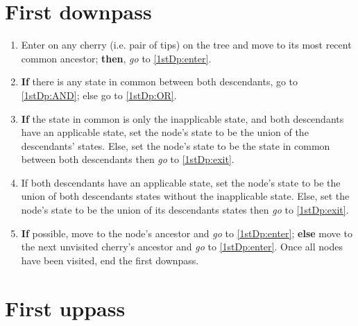 \documentclass[a4paper,12pt]{article}
\begin{document}

\section{First downpass} \label{1stDp}

\begin{enumerate}
    \item Enter on any cherry (i.e. pair of tips) on the tree and move to its most recent common ancestor; \textbf{then}, \textit{go} to \ref{1stDp:enter}.
    \item \label{1stDp:enter} \textbf{If} there is any state in common between both descendants, go to \ref{1stDp:AND}; else go to \ref{1stDp:OR}.
    \item \label{1stDp:AND} \textbf{If} the state in common is only the inapplicable state, and both descendants have an applicable state, set the node's state to be the union of the descendants' states. Else, set the node's state to be the state in common between both descendants then \textit{go} to \ref{1stDp:exit}.
    \item \label{1stDp:OR}  If both descendants have an applicable state, set the node's state to be the union of both descendants states without the inapplicable state. Else, set the node's state to be the union of its descendants states then \textit{go} to \ref{1stDp:exit}.
    \item \label{1stDp:exit} \textbf{If} possible, move to the node's ancestor and \textit{go} to \ref{1stDp:enter}; \textbf{else} move to the next unvisited cherry's ancestor and \textit{go} to \ref{1stDp:enter}. Once all nodes have been visited, end the first downpass.
\end{enumerate}


\section{First uppass} \label{1stUp}
\end{document}
